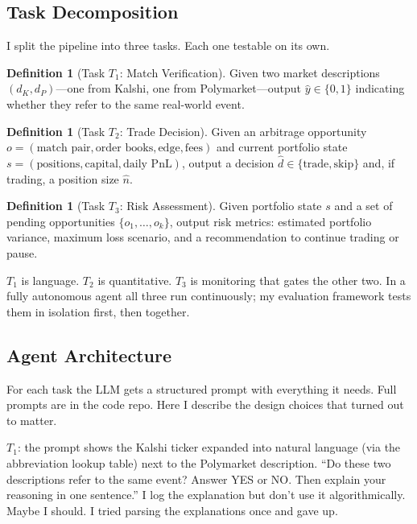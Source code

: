 \documentclass[11pt]{article}
\theoremstyle{definition}
\newtheorem{definition}[theorem]{Definition}
\theoremstyle{remark}
\begin{document}
\subsection{Task Decomposition}
\label{sec:tasks}

I split the pipeline into three tasks. Each one testable on its own.

\begin{definition}[Task $T_1$: Match Verification]
Given two market descriptions $(d_K, d_P)$---one from Kalshi, one from Polymarket---output $\hat{y} \in \{0, 1\}$ indicating whether they refer to the same real-world event.
\end{definition}

\begin{definition}[Task $T_2$: Trade Decision]
Given an arbitrage opportunity $o = (\text{match pair}, \text{order books}, \text{edge}, \text{fees})$ and current portfolio state $s = (\text{positions}, \text{capital}, \text{daily PnL})$, output a decision $\hat{d} \in \{\text{trade}, \text{skip}\}$ and, if trading, a position size $\hat{n}$.
\end{definition}

\begin{definition}[Task $T_3$: Risk Assessment]
Given portfolio state $s$ and a set of pending opportunities $\{o_1, \ldots, o_k\}$, output risk metrics: estimated portfolio variance, maximum loss scenario, and a recommendation to continue trading or pause.
\end{definition}

$T_1$ is language. $T_2$ is quantitative. $T_3$ is monitoring that gates the other two. In a fully autonomous agent all three run continuously; my evaluation framework tests them in isolation first, then together.

\subsection{Agent Architecture}
\label{sec:agent-arch}

For each task the LLM gets a structured prompt with everything it needs. Full prompts are in the code repo. Here I describe the design choices that turned out to matter.

$T_1$: the prompt shows the Kalshi ticker expanded into natural language (via the abbreviation lookup table) next to the Polymarket description. ``Do these two descriptions refer to the same event? Answer YES or NO. Then explain your reasoning in one sentence.'' I log the explanation but don't use it algorithmically. Maybe I should. I tried parsing the explanations once and gave up.
\end{document}

